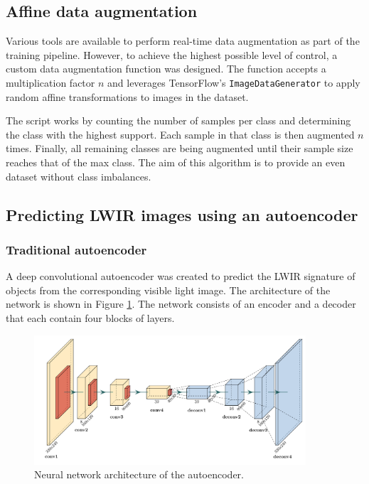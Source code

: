 \documentclass{l4proj}
\begin{document}
\subsection{Affine data augmentation}
\label{augmentation_impl}

Various tools are available to perform real-time data augmentation as part of the training pipeline. However, to achieve the highest possible level of control, a custom data augmentation function was designed. The function accepts a multiplication factor $n$ and leverages TensorFlow's \lstinline{ImageDataGenerator} to apply random affine transformations to images in the dataset.

The script works by counting the number of samples per class and determining the class with the highest support. Each sample in that class is then augmented $n$ times. Finally, all remaining classes are being augmented until their sample size reaches that of the max class. The aim of this algorithm is to provide an even dataset without class imbalances.


\subsection{Predicting LWIR images using an autoencoder}
\label{autoencoder_implementation}

\subsubsection{Traditional autoencoder}



A deep convolutional autoencoder was created to predict the LWIR signature of objects from the corresponding visible light image. The architecture of the network is shown in Figure \ref{fig:autoencoder_architecture}. The network consists of an encoder and a decoder that each contain four blocks of layers.

\begin{figure}[ht]
  \centering
  \includegraphics[width=0.9\textwidth]{images/models/autoencoder}
  \caption{Neural network architecture of the autoencoder.}
  \label{fig:autoencoder_architecture}
\end{figure}
\end{document}
